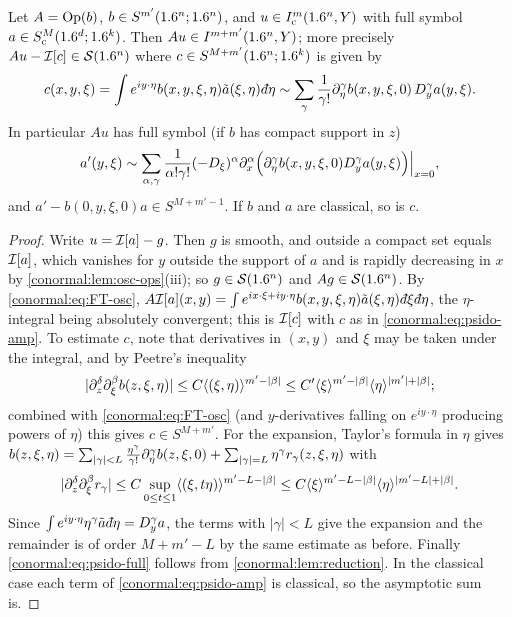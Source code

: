 \begin{proposition}\label{conormal:prop:psido-local}
  Let $A=\operatorname{Op}(b)$, $b\in S^{m'}(1.6^n;1.6^n)$, and $u\in I^{m}_{\mathrm c}(1.6^n,Y)$
  with full symbol $a\in S^M_{\mathrm c}(1.6^d;1.6^k)$.  Then
  $Au\in I^{m+m'}(1.6^n,Y)$; more precisely $Au-\mathcal{I}[c]\in\mathcal{S}(1.6^n)$ where
  $c\in S^{M+m'}(1.6^n;1.6^k)$ is given by
  \begin{equation}\label{conormal:eq:psido-amp}
    c(x,y,\xi)=\int e^{iy\cdot\eta}b(x,y,\xi,\eta)\tilde a(\xi,\eta)\,\dbar\eta
    \sim\sum_\gamma\frac1{\gamma!}\pa_\eta^\gamma b(x,y,\xi,0)\,D_y^\gamma
    a(y,\xi).
  \end{equation}
  In particular $Au$ has full symbol (if $b$ has compact support in $z$)
  \begin{equation}\label{conormal:eq:psido-full}
    a'(y,\xi)\sim\sum_{\alpha,\gamma}\frac1{\alpha!\gamma!}(-D_\xi)^\alpha\partial_x^\alpha
    \Big(\partial_\eta^\gamma b(x,y,\xi,0)D_y^\gamma a(y,\xi)\Big)\Big|_{x=0},
  \end{equation}
  and $a'-b(0,y,\xi,0)a\in S^{M+m'-1}$.  If $b$ and $a$ are classical, so is $c$.
\end{proposition}
\begin{proof}
  Write $u=\mathcal{I}[a]-g$.  Then $g$ is smooth, and outside a compact set equals
  $\mathcal{I}[a]$, which vanishes for $y$ outside the support of $a$ and is rapidly
  decreasing in $x$ by \cref{conormal:lem:osc-ops}(iii); so $g\in\mathcal{S}(1.6^n)$
  and $Ag\in\mathcal{S}(1.6^n)$.  By \eqref{conormal:eq:FT-osc}, $A\osc{a}(x,y)=\int
  e^{ix\cdot\xi+iy\cdot\eta}b(x,y,\xi,\eta)\tilde a(\xi,\eta)\,\dbar\xi\,\dbar\eta$,
  the $\eta$-integral being absolutely convergent; this is $\mathcal{I}[c]$ with $c$ as in
  \eqref{conormal:eq:psido-amp}.  To estimate $c$, note that derivatives in
  $(x,y)$ and $\xi$ may be taken under the integral, and by Peetre's inequality
  \begin{equation*}
    |\partial_z^\delta\partial_\xi^{\beta}b(z,\xi,\eta)|\le
    C\langle (\xi,\eta)\rangle^{m'-|\beta|}\le C'\langle \xi\rangle^{m'-|\beta|}
    \langle \eta\rangle^{|m'|+|\beta|};
  \end{equation*}
  combined with \eqref{conormal:eq:FT-osc} (and $y$-derivatives falling on
  $e^{iy\cdot\eta}$ producing powers of $\eta$) this gives $c\in S^{M+m'}$.  For
  the expansion, Taylor's formula in $\eta$ gives
  $b(z,\xi,\eta)=\sum_{|\gamma|<L}\frac{\eta^\gamma}{\gamma!}\partial_\eta^\gamma
  b(z,\xi,0)+\sum_{|\gamma|=L}\eta^\gamma r_\gamma(z,\xi,\eta)$ with
  \begin{equation*}
    |\partial_z^\delta\partial_\xi^\beta r_\gamma|\le C\sup_{0\le t\le1}
    \langle (\xi,t\eta)\rangle^{m'-L-|\beta|}\le C\langle \xi\rangle^{m'-L-|\beta|}
    \langle \eta\rangle^{|m'-L|+|\beta|}.
  \end{equation*}  Since $\int e^{iy\cdot\eta}\eta^\gamma\tilde
  a\,\dbar\eta=D_y^\gamma a$, the terms with $|\gamma|<L$ give the expansion
  and the remainder is of order $M+m'-L$ by the same estimate as before.
  Finally \eqref{conormal:eq:psido-full} follows from
  \cref{conormal:lem:reduction}.  In the classical case each term of
  \eqref{conormal:eq:psido-amp} is classical, so the asymptotic sum is.
\end{proof}

